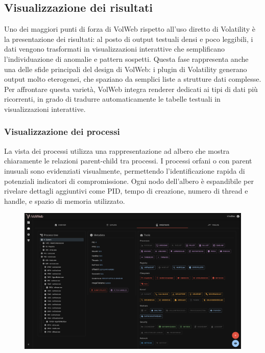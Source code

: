 \subsection{Visualizzazione dei risultati}

Uno dei maggiori punti di forza di VolWeb rispetto all’uso diretto di Volatility è la presentazione dei risultati: al posto di output testuali densi e poco leggibili, i dati vengono trasformati in visualizzazioni interattive che semplificano l’individuazione di anomalie e pattern sospetti.
Questa fase rappresenta anche una delle sfide principali del design di VolWeb: i plugin di Volatility generano output molto eterogenei, che spaziano da semplici liste a strutture dati complesse. Per affrontare questa varietà, VolWeb integra renderer dedicati ai tipi di dati più ricorrenti, in grado di tradurre automaticamente le tabelle testuali in visualizzazioni interattive.

\subsubsection{Visualizzazione dei processi}

La vista dei processi utilizza una rappresentazione ad albero che mostra chiaramente le relazioni parent-child tra processi. I processi orfani o con parent inusuali sono evidenziati visualmente, permettendo l'identificazione rapida di potenziali indicatori di compromissione. Ogni nodo dell'albero è espandibile per rivelare dettagli aggiuntivi come PID, tempo di creazione, numero di thread e handle, e spazio di memoria utilizzato.

\begin{figure}[H]
    \centering
    \includegraphics[width=1\linewidth]{images/volweb-original/volweb-process-tree.png}
\end{figure}

